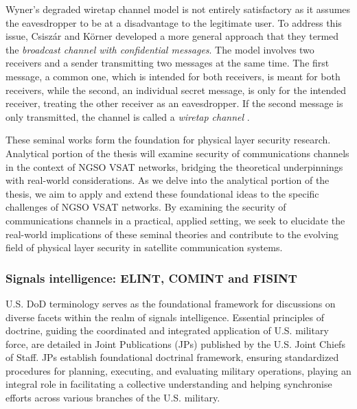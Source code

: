 \documentclass[english, 12pt, a4paper, elec, utf8, a-1b, online]{aaltothesis}
\begin{document}
Wyner's degraded wiretap channel model is not entirely satisfactory as it assumes the eavesdropper to be at a disadvantage to the legitimate user. To address this issue, Csiszár and Körner \cite{csiszar1978broadcast} developed a more general approach that they termed the \textit{broadcast channel with confidential messages}.
The model involves two receivers and a sender transmitting two messages at the same time.
The first message, a common one, which is intended for both receivers, is meant for both receivers, while the second, an individual secret message, is only for the intended receiver, treating the other receiver as an eavesdropper.
If the second message is only transmitted, the channel is called a \textit{wiretap channel} \cite{bloch2011physical}.

These seminal works form the foundation for physical layer security research.
Analytical portion of the thesis will examine security of communications channels in the context of NGSO VSAT networks, bridging the theoretical underpinnings with real-world considerations.
As we delve into the analytical portion of the thesis, we aim to apply and extend these foundational ideas to the specific challenges of NGSO VSAT networks.
By examining the security of communications channels in a practical, applied setting, we seek to elucidate the real-world implications of these seminal theories and contribute to the evolving field of physical layer security in satellite communication systems.

\subsubsection{Signals intelligence: ELINT, COMINT and FISINT}
U.S. DoD terminology serves as the foundational framework for discussions on diverse facets within the realm of signals intelligence.
Essential principles of doctrine, guiding the coordinated and integrated application of U.S. military force, are detailed in Joint Publications (JPs) published by the U.S. Joint Chiefs of Staff.
JPs establish foundational doctrinal framework, ensuring standardized procedures for planning, executing, and evaluating military operations, playing an integral role in facilitating a collective understanding and helping synchronise efforts across various branches of the U.S. military.
\end{document}
